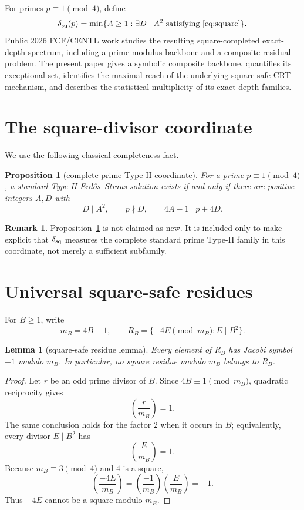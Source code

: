 \documentclass[11pt]{article}
\newtheorem{lemma}[theorem]{Lemma}
\newtheorem{proposition}[theorem]{Proposition}
\theoremstyle{definition}
\newtheorem{remark}[theorem]{Remark}
\newcommand{\sqdepth}{\delta_{\rm sq}}
\begin{document}
For primes $p\equiv1\pmod4$, define
\[
\sqdepth(p)=\min\{A\ge1:\exists D\mid A^2\text{ satisfying \eqref{eq:square}}\}.
\]
Public 2026 FCF/CENTL work studies the resulting square-completed exact-depth spectrum, including a prime-modulus backbone and a composite residual problem. The present paper gives a symbolic composite backbone, quantifies its exceptional set, identifies the maximal reach of the underlying square-safe CRT mechanism, and describes the statistical multiplicity of its exact-depth families.

\section{The square-divisor coordinate}
We use the following classical completeness fact.

\begin{proposition}[complete prime Type-II coordinate]\label{prop:complete}
For a prime $p\equiv1\pmod4$, a standard Type-II Erd\H{o}s--Straus solution exists if and only if there are positive integers $A,D$ with
\[
D\mid A^2,\qquad p\nmid D,\qquad 4A-1\mid p+4D.
\]
\end{proposition}

\begin{remark}
Proposition~\ref{prop:complete} is not claimed as new. It is included only to make explicit that $\sqdepth$ measures the complete standard prime Type-II family in this coordinate, not merely a sufficient subfamily.
\end{remark}

\section{Universal square-safe residues}
For $B\ge1$, write
\[
m_B=4B-1,\qquad R_B=\{-4E\pmod{m_B}:E\mid B^2\}.
\]

\begin{lemma}[square-safe residue lemma]\label{lem:squaresafe}
Every element of $R_B$ has Jacobi symbol $-1$ modulo $m_B$. In particular, no square residue modulo $m_B$ belongs to $R_B$.
\end{lemma}

\begin{proof}
Let $r$ be an odd prime divisor of $B$. Since $4B\equiv1\pmod{m_B}$, quadratic reciprocity gives
\[
\left(\frac r{m_B}\right)=1.
\]
The same conclusion holds for the factor $2$ when it occurs in $B$; equivalently, every divisor $E\mid B^2$ has
\[
\left(\frac E{m_B}\right)=1.
\]
Because $m_B\equiv3\pmod4$ and $4$ is a square,
\[
\left(\frac{-4E}{m_B}\right)=
\left(\frac{-1}{m_B}\right)
\left(\frac E{m_B}\right)=-1.
\]
Thus $-4E$ cannot be a square modulo $m_B$.
\end{proof}
\end{document}
